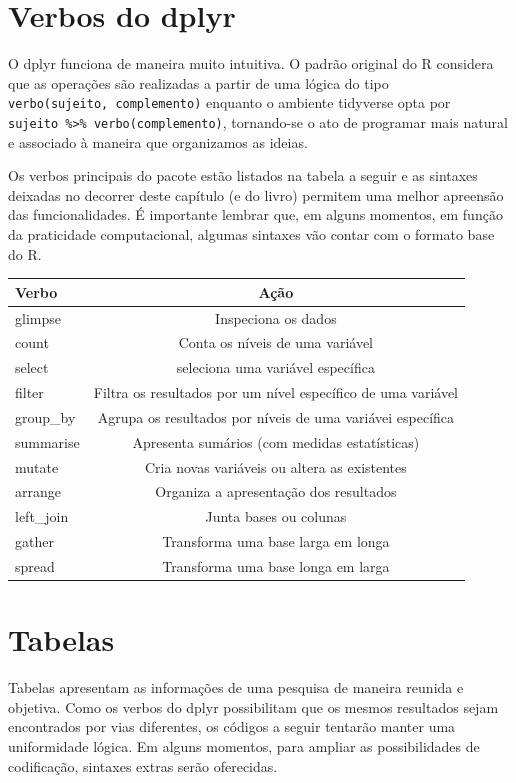 \documentclass[
]{book}
\begin{document}
\hypertarget{verbos-do-dplyr}{%
\section{Verbos do dplyr}\label{verbos-do-dplyr}}

O dplyr funciona de maneira muito intuitiva. O padrão original do R considera que as operações são realizadas a partir de uma lógica do tipo \texttt{verbo(sujeito,\ complemento)} enquanto o ambiente tidyverse opta por \texttt{sujeito\ \%\textgreater{}\%\ verbo(complemento)}, tornando-se o ato de programar mais natural e associado à maneira que organizamos as ideias.

Os verbos principais do pacote estão listados na tabela a seguir e as sintaxes deixadas no decorrer deste capítulo (e do livro) permitem uma melhor apreensão das funcionalidades. É importante lembrar que, em alguns momentos, em função da praticidade computacional, algumas sintaxes vão contar com o formato base do R.

\begin{longtable}[]{@{}lc@{}}
\toprule
Verbo & Ação\tabularnewline
\midrule
\endhead
glimpse & Inspeciona os dados\tabularnewline
count & Conta os níveis de uma variável\tabularnewline
select & seleciona uma variável específica\tabularnewline
filter & Filtra os resultados por um nível específico de uma variável\tabularnewline
group\_by & Agrupa os resultados por níveis de uma variávei específica\tabularnewline
summarise & Apresenta sumários (com medidas estatísticas)\tabularnewline
mutate & Cria novas variáveis ou altera as existentes\tabularnewline
arrange & Organiza a apresentação dos resultados\tabularnewline
left\_join & Junta bases ou colunas\tabularnewline
gather & Transforma uma base larga em longa\tabularnewline
spread & Transforma uma base longa em larga\tabularnewline
\bottomrule
\end{longtable}

\hypertarget{tabelas}{%
\section{Tabelas}\label{tabelas}}

Tabelas apresentam as informações de uma pesquisa de maneira reunida e objetiva. Como os verbos do dplyr possibilitam que os mesmos resultados sejam encontrados por vias diferentes, os códigos a seguir tentarão manter uma uniformidade lógica. Em alguns momentos, para ampliar as possibilidades de codificação, sintaxes extras serão oferecidas.
\end{document}
